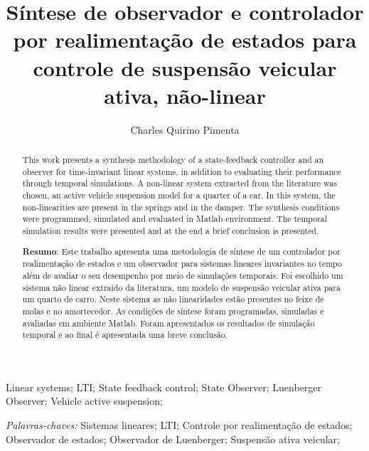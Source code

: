 \documentclass[a4paper]{ifacconf}
\begin{document}
	
	
    \begin{frontmatter}
        
        \title{Síntese de observador e controlador por realimentação de estados para controle de suspensão veicular ativa, não-linear} 

        \author[First]{Charles Quirino Pimenta} 
        
        \address[First]{Programa de Pós-Graduação em Engenharia Elétrica - Universidade Federal de 
Minas Gerais - Av. Antônio Carlos 6627, 31270-901, Belo Horizonte, MG, Brasil\\ e-mail:charlesqp@ufmg.br.}
        
        \renewcommand{\abstractname}{{\bf Abstract:~}}
        \begin{abstract} This work presents a synthesis methodology of a state-feedback controller and an observer for time-invariant linear systems, in addition to evaluating their performance through temporal simulations. A non-linear system extracted from the literature was chosen, an active vehicle suspension model for a quarter of a car. In this system, the non-linearities are present in the springs and in the damper. The synthesis conditions were programmed, simulated and evaluated in Matlab\textsuperscript{\textregistered} environment. The temporal simulation results were presented and at the end a brief conclusion is presented.
        
        \vskip 1mm%
        {\noindent \bf Resumo}: Este trabalho apresenta uma metodologia de síntese de um controlador por realimentação de estados e um observador para sistemas lineares invariantes no tempo além de avaliar o seu desempenho por meio de simulações temporais. Foi escolhido um sistema não linear extraído da literatura, um modelo de suspensão veicular ativa para um quarto de carro. Neste sistema as não linearidades estão presentes no feixe de molas e no amortecedor. As condições de síntese foram programadas, simuladas e avaliadas em ambiente Matlab\textsuperscript{\textregistered}. Foram apresentados os resultados de simulação temporal e ao final é apresentada uma breve conclusão.
        \end{abstract}
        
        
        \begin{keyword} Linear systems; LTI; State feedback control; State Observer; Luenberger Observer; Vehicle active suspension;
        
        \vskip 1mm%
        {\noindent\it Palavras-chaves:} Sistemas lineares; LTI; Controle por realimentação de estados; Observador de estados; Observador de Luenberger; Suspensão ativa veicular;
        \end{keyword}
        
        
        \end{frontmatter}
\end{document}
